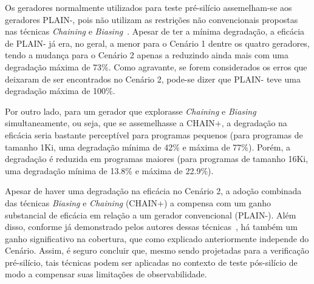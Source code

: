 Os geradores normalmente utilizados para teste pré-silício assemelham-se aos
geradores PLAIN-, pois não utilizam as restrições não convencionais propostas
nas técnicas \textit{Chaining} e \textit{Biasing}~\cite{Andrade:2019}. Apesar
de ter a mínima degradação, a eficácia de PLAIN- já era, no geral, a menor para
o Cenário 1 dentre os quatro geradores, tendo a mudança para o Cenário 2 apenas
a reduzindo ainda mais com uma degradação máxima de 73\%. Como agravante, se
forem considerados os erros que deixaram de ser encontrados no Cenário 2,
pode-se dizer que PLAIN- teve uma degradação máxima de 100\%.

Por outro lado, para um gerador que explorasse \textit{Chaining} e
\textit{Biasing} simultaneamente, ou seja, que se assemelhasse a CHAIN+, a
degradação na eficácia seria bastante perceptível para programas pequenos (para
programas de tamanho 1Ki, uma degradação mínima de 42\% e máxima de 77\%).
Porém, a degradação é reduzida em programas maiores (para programas de tamanho
16Ki, uma degradação mínima de 13.8\% e máxima de 22.9\%).

Apesar de haver uma degradação na eficácia no Cenário 2, a adoção combinada das
técnicas \textit{Biasing} e \textit{Chaining} (CHAIN+) a compensa com um ganho
substancial de eficácia em relação a um gerador convencional (PLAIN-). Além
disso, conforme já demonstrado pelos autores dessas
técnicas~\cite{Andrade:2019}, há também um ganho significativo na cobertura,
que como explicado anteriormente independe do Cenário. Assim, é seguro concluir
que, mesmo sendo projetadas para a verificação pré-silício, tais técnicas podem
ser aplicadas no contexto de teste pós-silício de modo a compensar suas
limitações de observabilidade.



